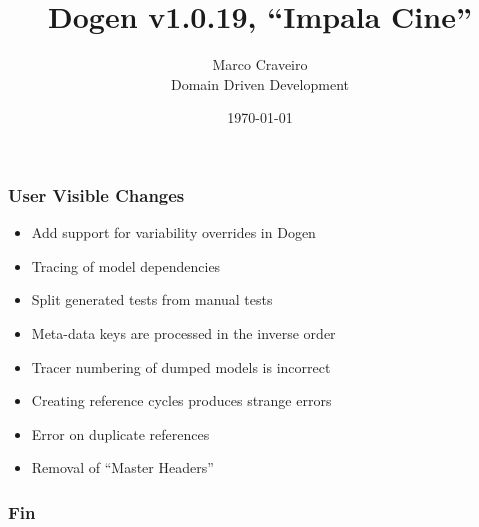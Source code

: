 \documentclass{beamer}
\title{Dogen v1.0.19, \enquote{Impala Cine}}
\author{Marco Craveiro \\
  Domain Driven Development
}
\date{\today}
\begin{document}
\begin{frame}
\titlepage{}
\end{frame}

\begin{frame}
\frametitle{User Visible Changes}

\begin{itemize}
  \pause{}
\item Add support for variability overrides in Dogen
  \pause{}
\item Tracing of model dependencies
  \pause{}
\item Split generated tests from manual tests
  \pause{}
\item Meta-data keys are processed in the inverse order
  \pause{}
\item Tracer numbering of dumped models is incorrect
  \pause{}
\item Creating reference cycles produces strange errors
  \pause{}
\item Error on duplicate references
  \pause{}
\item Removal of ``Master Headers''
\end{itemize}

\end{frame}

\begin{frame}
\frametitle{Fin}
\end{frame}
\end{document}
